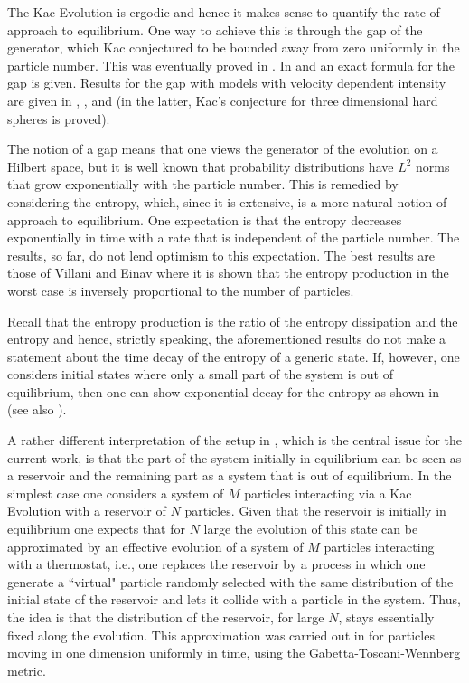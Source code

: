 \documentclass{article}
\begin{document}
The Kac Evolution is ergodic and hence it makes sense to quantify the rate of approach to equilibrium. One way to
achieve this is through the gap of the generator, which Kac \cite{Kac} conjectured to be bounded away from zero
uniformly in the particle number. This was eventually proved in \cite{Jeanvresse}. In \cite{CCL1} and \cite{Maslen} an
exact formula for the gap is given. Results for the gap with models with velocity dependent intensity are given in
\cite{villani}, \cite{CCL2}, and \cite{CCL3} (in the latter, Kac's conjecture for three dimensional hard spheres is
proved).

The notion of a gap means that one views the generator of the evolution on a Hilbert space, but it is well known that
probability distributions   have $L^2$ norms that grow exponentially with the particle number. This is remedied by
considering the entropy, which, since it is extensive, is a more natural notion of approach to equilibrium. One
expectation is that the entropy decreases exponentially in time with a rate that is independent of the particle number.
The results, so far, do not lend optimism to this expectation. The best results are those of Villani \cite{villani} and
Einav \cite{amit} where it is shown that the entropy production in the worst case is inversely proportional to the
number of particles.

Recall that the entropy production is the ratio of the entropy dissipation and the entropy and hence, strictly speaking,
the aforementioned results do not make a statement about the time decay of the entropy of a generic state. If, however,
one considers initial states where only a small part of the system is out of equilibrium, then one can show exponential
decay for the entropy as shown in \cite{BGLR} (see also \cite{BCHL}).


A rather different interpretation of the setup in \cite{BGLR}, which is the central issue for the current work,  is that
the part of the system initially in equilibrium can be seen as a reservoir and the remaining part as a system that is
out of equilibrium. In the simplest case one considers a system of $M$ particles interacting via a Kac Evolution with a
reservoir of $N$ particles. Given that the reservoir is initially in equilibrium one expects that for $N$ large the
evolution of this state can be approximated by an effective evolution of a system of $M$ particles interacting with a
thermostat, i.e., one replaces the reservoir by a process in which one generate a ``virtual" particle randomly
selected with the same distribution of the initial state of the reservoir and lets it collide with a particle in the
system. Thus, the idea is that the distribution of the reservoir, for large $N$, stays essentially fixed along the
evolution. This approximation was carried out in \cite{BLTV} for particles moving in one dimension uniformly in time,
using the Gabetta-Toscani-Wennberg metric.
\end{document}
